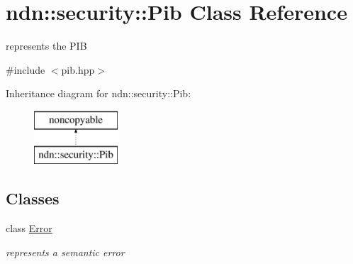 \hypertarget{classndn_1_1security_1_1Pib}{}\section{ndn\+:\+:security\+:\+:Pib Class Reference}
\label{classndn_1_1security_1_1Pib}


represents the P\+IB  




{\ttfamily \#include $<$pib.\+hpp$>$}

Inheritance diagram for ndn\+:\+:security\+:\+:Pib\+:\begin{figure}[H]
\begin{center}
\leavevmode
\includegraphics[height=2.000000cm]{classndn_1_1security_1_1Pib}
\end{center}
\end{figure}
\subsection*{Classes}
\begin{DoxyCompactItemize}
\item 
class \hyperlink{classndn_1_1security_1_1Pib_1_1Error}{Error}
\begin{DoxyCompactList}\small\item\em represents a semantic error \end{DoxyCompactList}\end{DoxyCompactItemize}
